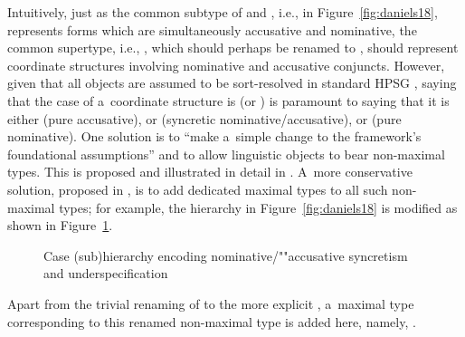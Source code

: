 \documentclass[output=paper,biblatex,babelshorthands,newtxmath,draftmode,colorlinks,citecolor=brown]{langscibook}
\begin{document}
\begin{exe}
\begin{xlist}
\begin{exe}
\begin{xlist}
Intuitively, just as the common subtype of  and , i.e., 
in Figure~\ref{fig:daniels18}, represents forms which are simultaneously accusative and nominative, the common
supertype, i.e., , which should perhaps be renamed to , should represent
coordinate structures involving nominative and accusative conjuncts.  However, given that all
objects are assumed to be sort-resolved in standard HPSG \crossrefchapterp[\page \pageref{page-wellformedness-linguistic-objects}]{formal-background}, saying that the case of a~coordinate
structure is  (or ) is paramount to saying that it is either
 (pure accusative), or  (syncretic nominative/accusative), or
 (pure nominative).  One solution is to “make a~simple change to the framework's
foundational assumptions” \citep[268]{sag:02} and to allow linguistic objects to bear non-maximal
types.  This is proposed and illustrated in detail in \citet{sag:02}.  A~more conservative
solution, proposed in \citet{dani:01}, is to add dedicated maximal types to all such non-maximal
types; for example, the hierarchy in Figure~\ref{fig:daniels18} is modified as shown in Figure~\ref{fig:daniels20}.
\begin{figure}
\caption{Case (sub)hierarchy encoding nominative/""accusative syncretism and underspecification}
\label{fig:daniels20} 
\end{figure}
Apart from the trivial renaming of  to the more explicit , a~maximal type corresponding to this renamed non-maximal type is added here, namely, .


\end{xlist}
\end{exe}
\end{xlist}
\end{exe}
\end{document}
